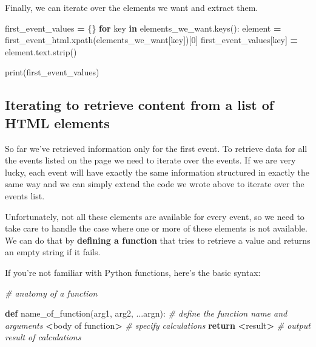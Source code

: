 \documentclass[
]{book}
\newenvironment{Shaded}{\begin{snugshade}}{\end{snugshade}}
\newcommand{\BuiltInTok}[1]{#1}
\newcommand{\CommentTok}[1]{\textcolor[rgb]{0.56,0.35,0.01}{\textit{#1}}}
\newcommand{\ControlFlowTok}[1]{\textcolor[rgb]{0.13,0.29,0.53}{\textbf{#1}}}
\newcommand{\DecValTok}[1]{\textcolor[rgb]{0.00,0.00,0.81}{#1}}
\newcommand{\KeywordTok}[1]{\textcolor[rgb]{0.13,0.29,0.53}{\textbf{#1}}}
\newcommand{\NormalTok}[1]{#1}
\newcommand{\OperatorTok}[1]{\textcolor[rgb]{0.81,0.36,0.00}{\textbf{#1}}}
\begin{document}
Finally, we can iterate over the elements we want and extract them.

\begin{Shaded}
\begin{Highlighting}[]
\NormalTok{first\_event\_values }\OperatorTok{=}\NormalTok{ \{\}}
\ControlFlowTok{for}\NormalTok{ key }\KeywordTok{in}\NormalTok{ elements\_we\_want.keys():}
\NormalTok{    element }\OperatorTok{=}\NormalTok{ first\_event\_html.xpath(elements\_we\_want[key])[}\DecValTok{0}\NormalTok{]}
\NormalTok{    first\_event\_values[key] }\OperatorTok{=}\NormalTok{ element.text.strip()}

\BuiltInTok{print}\NormalTok{(first\_event\_values)}
\end{Highlighting}
\end{Shaded}

\hypertarget{iterating-to-retrieve-content-from-a-list-of-html-elements}{%
\subsection{Iterating to retrieve content from a list of HTML elements}\label{iterating-to-retrieve-content-from-a-list-of-html-elements}}

So far we've retrieved information only for the first event. To
retrieve data for all the events listed on the page we need to iterate
over the events. If we are very lucky, each event will have exactly
the same information structured in exactly the same way and we can
simply extend the code we wrote above to iterate over the events list.

Unfortunately, not all these elements are available for every event, so
we need to take care to handle the case where one or more of these
elements is not available. We can do that by \textbf{defining a function} that
tries to retrieve a value and returns an empty string if it fails.

If you're not familiar with Python functions, here's the basic syntax:

\begin{Shaded}
\begin{Highlighting}[]
\CommentTok{\# anatomy of a function}

\KeywordTok{def}\NormalTok{ name\_of\_function(arg1, arg2, ...argn):  }\CommentTok{\# define the function name and arguments}
    \OperatorTok{\textless{}}\NormalTok{body of function}\OperatorTok{\textgreater{}}   \CommentTok{\# specify calculations}
    \ControlFlowTok{return} \OperatorTok{\textless{}}\NormalTok{result}\OperatorTok{\textgreater{}}      \CommentTok{\# output result of calculations}
\end{Highlighting}
\end{Shaded}
\end{document}

